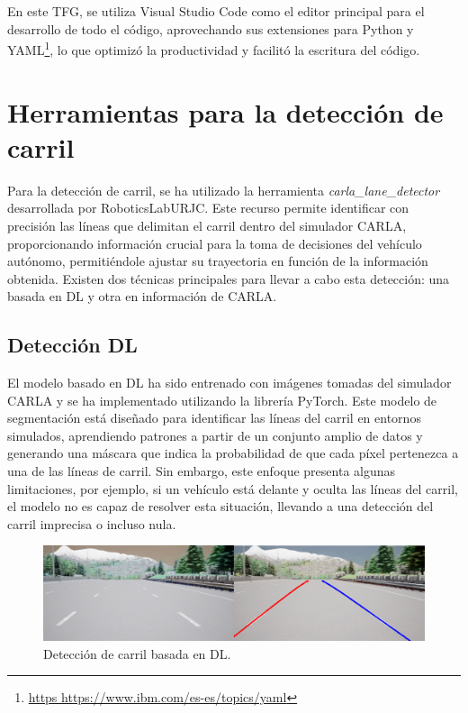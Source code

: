 \newpage

En este \ac{TFG}, se utiliza Visual Studio Code como el editor principal para el desarrollo de todo el código, aprovechando sus extensiones para Python y YAML\footnote{\url{https https://www.ibm.com/es-es/topics/yaml}}, lo que optimizó la productividad y facilitó la escritura del código.

\section{Herramientas para la detección de carril}
\label{sec:herramientas_carril}

Para la detección de carril, se ha utilizado la herramienta \textit{carla\_lane\_detector} desarrollada por RoboticsLabURJC. Este recurso permite identificar con precisión las líneas que delimitan el carril dentro del simulador CARLA, proporcionando información crucial para la toma de decisiones del vehículo autónomo, permitiéndole ajustar su trayectoria en función de la información obtenida. Existen dos técnicas principales para llevar a cabo esta detección: una basada en \ac{DL} y otra en información de CARLA.

\subsection{Detección \ac{DL}}
\label{sec:carril_dl3}

El modelo basado en \ac{DL} ha sido entrenado con imágenes tomadas del simulador CARLA y se ha implementado utilizando la librería PyTorch. Este modelo de segmentación está diseñado para identificar las líneas del carril en entornos simulados, aprendiendo patrones a partir de un conjunto amplio de datos y generando una máscara que indica la probabilidad de que cada píxel pertenezca a una de las líneas de carril. Sin embargo, este enfoque presenta algunas limitaciones, por ejemplo, si un vehículo está delante y oculta las líneas del carril, el modelo no es capaz de resolver esta situación, llevando a una detección del carril imprecisa o incluso nula.

\begin{figure}[ht]
  \begin{center}
    \includegraphics[width=13cm]{figs/Plataformas_Desarollo/carla_lane_dl.png}
  \end{center}
  \caption{Detección de carril basada en \ac{DL}.}
  \label{dl_lane}
\end{figure}

